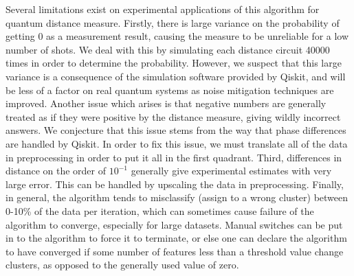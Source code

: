 \documentclass[twocolumn, english]{revtex4-2}
\numberwithin{equation}{section}
\begin{document}
Several limitations exist on experimental applications of this algorithm for quantum distance measure. Firstly, there is large variance on the probability of getting 0 as a measurement result, causing the measure to be unreliable for a low number of shots. We deal with this by simulating each distance circuit 40000 times in order to determine the probability. However, we suspect that this large variance is a consequence of the simulation software provided by Qiskit, and will be less of a factor on real quantum systems as noise mitigation techniques are improved. Another issue which arises is that negative numbers are generally treated as if they were positive by the distance measure, giving wildly incorrect answers. We conjecture that this issue stems from the way that phase differences are handled by Qiskit. In order to fix this issue, we must translate all of the data in preprocessing in order to put it all in the first quadrant. Third, differences in distance on the order of $10^{-1}$ generally give experimental estimates with very large error. This can be handled by upscaling the data in preprocessing. Finally, in general, the algorithm tends to misclassify (assign to a wrong cluster) between 0-10\% of the data per iteration, which can sometimes cause failure of the algorithm to converge, especially for large datasets. Manual switches can be put in to the algorithm to force it to terminate, or else one can declare the algorithm to have converged if some number of features less than a threshold value change clusters, as opposed to the generally used value of zero.
\end{document}
